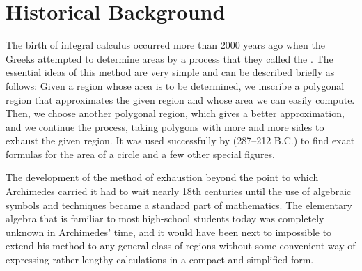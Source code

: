 \section{Historical Background}\label{sec:1.1.2}

\begin{note}
  The birth of integral calculus occurred more than 2000 years ago when the Greeks attempted to determine areas by a process that they called the \textbf{}.
  The essential ideas of this method are very simple and can be described briefly as follows:
  Given a region whose area is to be determined, we inscribe a polygonal region that approximates the given region and whose area we can easily compute.
  Then, we choose another polygonal region, which gives a better approximation, and we continue the process, taking polygons with more and more sides to exhaust the given region.
  It was used successfully by \href{https://en.wikipedia.org/wiki/Archimedes}{} (287--212 B.C.) to find exact formulas for the area of a circle and a few other special figures.

  The development of the method of exhaustion beyond the point to which Archimedes carried it had to wait nearly 18th centuries until the use of algebraic symbols and techniques became a standard part of mathematics.
  The elementary algebra that is familiar to most high-school students today was completely unknown in Archimedes' time, and it would have been next to impossible to extend his method to any general class of regions without some convenient way of expressing rather lengthy calculations in a compact and simplified form.


\end{note}
